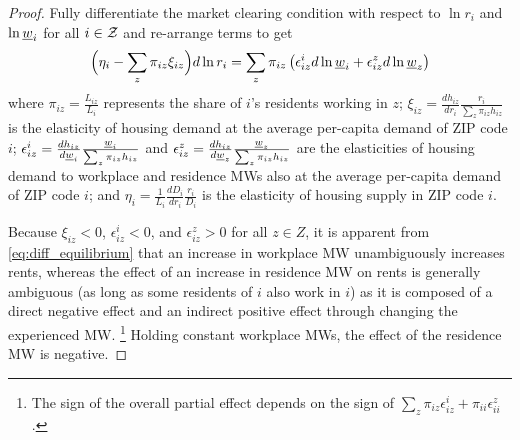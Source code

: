 \begin{proof}
    Fully differentiate the market clearing condition with respect to $\ln r_i$ and 
    $\ln \underline{w}_i$ for all $i\in\mathcal{Z}$ and re-arrange terms to get
    \begin{equation}\label{eq:diff_equilibrium}
        \Big(\eta_i - \sum_z \pi_{iz} \xi_{iz} \Big) d \ln r_i
        = 
        \sum_z \pi_{iz} \left(\epsilon_{iz}^i d \ln \underline{w}_i 
                            + \epsilon_{iz}^z d \ln \underline{w}_z \right)
    \end{equation}
    where 
    $\pi_{iz} = \frac{L_{iz}}{L_i}$ represents the share of $i$'s residents working 
    in $z$;
    $\xi_{iz} = \frac{d h_{iz}}{d r_i} \frac{r_i}{\sum_z \pi_{iz} h_{iz}}$ is the 
    elasticity of housing demand at the average per-capita demand of ZIP code $i$;
    $\epsilon_{iz}^i = \frac{d h_{iz}}{d \underline{w}_i} \frac{\underline{w}_i}{\sum_z \pi_{iz} h_{iz}}$ and 
    $\epsilon_{iz}^z = \frac{d h_{iz}}{d \underline{w}_z} \frac{\underline{w}_z}{\sum_z \pi_{iz} h_{iz}}$ 
    are the elasticities of housing demand to workplace and residence MWs also at 
    the average per-capita demand of ZIP code $i$; and
    $\eta_i = \frac{1}{L_i} \frac{d D_i}{d r_i} \frac{r_i}{D_i}$ is the elasticity 
    of housing supply in ZIP code $i$.

    Because $\xi_{iz} < 0$, $\epsilon_{iz}^i < 0$, and $\epsilon_{iz}^z > 0$ for 
    all $z\in Z$, it is apparent from \eqref{eq:diff_equilibrium} that an increase 
    in workplace MW unambiguously increases rents, whereas the effect of an increase
    in residence MW on rents is generally ambiguous (as long as some residents of
    $i$ also work in $i$) as it is composed of a direct negative effect and an 
    indirect positive effect through changing the experienced MW.%
    \footnote{The sign of the overall partial effect depends on the sign of 
    $\sum_z \pi_{iz} \epsilon_{iz}^i + \pi_{ii} \epsilon_{ii}^z$.}
    Holding constant workplace MWs, the effect of the residence MW is negative.
\end{proof}

